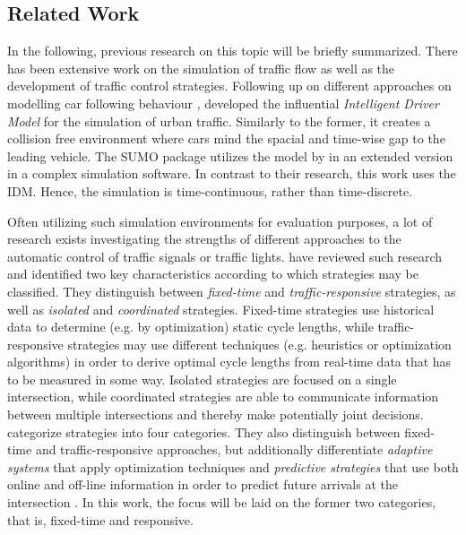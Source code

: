 \documentclass[11pt]{article}
\begin{document}
\subsection{Related Work}
\label{sec:related-work}
In the following, previous research on this topic will be briefly summarized. There has been extensive work on the simulation of traffic flow as well as the development of traffic control strategies. Following up on different approaches on modelling car following behaviour \citep[e.g.][]{gipps1981behavioural}, \citet{treiber2000congested} developed the influential \textit{Intelligent Driver Model} for the simulation of urban traffic. Similarly to the former, it creates a collision free environment where cars mind the  spacial and time-wise gap to the leading vehicle. The SUMO package \citep{krajzewicz2002sumo, behrisch2011sumo} utilizes the model by \citep{gipps1981behavioural} in an extended version \citep{krauss1998microscopic} in a complex simulation software. In contrast to their research, this work uses the IDM. Hence, the simulation is time-continuous, rather than time-discrete.

Often utilizing such simulation environments for evaluation purposes, a lot of research exists investigating the strengths of different approaches to the automatic control of traffic signals or traffic lights. \citet{papageorgiou2003review} have reviewed such research and identified two key characteristics according to which strategies may be classified. They distinguish between \textit{fixed-time} and \textit{traffic-responsive} strategies, as well as \textit{isolated} and \textit{coordinated} strategies. Fixed-time strategies use historical data to determine (e.g. by optimization) static cycle lengths, while traffic-responsive strategies may use different techniques (e.g. heuristics or optimization algorithms) in order to derive optimal cycle lengths from real-time data that has to be measured in some way. Isolated strategies are focused on a single intersection, while coordinated strategies are able to communicate information between multiple intersections and thereby make potentially joint decisions. \citet{coll2013linear} categorize strategies into four categories. They also distinguish between fixed-time and traffic-responsive approaches, but additionally differentiate \textit{adaptive systems} that apply optimization techniques and \textit{predictive strategies} that use both online and off-line information in order to predict future arrivals at the intersection \citep{coll2013linear}. In this work, the focus will be laid on the former two categories, that is, fixed-time and responsive.
\end{document}
